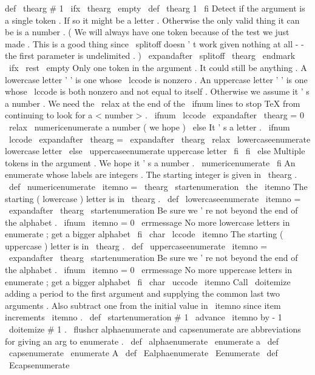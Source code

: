 {{def
\
thearg
{
#
1
}
%
\
ifx
\
thearg
\
empty
\
def
\
thearg
{
1
}
\
fi
%
%
Detect
if
the
argument
is
a
single
token
.
If
so
it
might
be
a
%
letter
.
Otherwise
the
only
valid
thing
it
can
be
is
a
number
.
%
(
We
will
always
have
one
token
because
of
the
test
we
just
made
.
%
This
is
a
good
thing
since
\
splitoff
doesn
'
t
work
given
nothing
at
%
all
-
-
the
first
parameter
is
undelimited
.
)
\
expandafter
\
splitoff
\
thearg
\
endmark
\
ifx
\
rest
\
empty
%
Only
one
token
in
the
argument
.
It
could
still
be
anything
.
%
A
lowercase
letter
'
'
is
one
whose
\
lccode
is
nonzero
.
%
An
uppercase
letter
'
'
is
one
whose
\
lccode
is
both
nonzero
and
%
not
equal
to
itself
.
%
Otherwise
we
assume
it
'
s
a
number
.
%
%
We
need
the
\
relax
at
the
end
of
the
\
ifnum
lines
to
stop
TeX
from
%
continuing
to
look
for
a
<
number
>
.
%
\
ifnum
\
lccode
\
expandafter
\
thearg
=
0
\
relax
\
numericenumerate
%
a
number
(
we
hope
)
\
else
%
It
'
s
a
letter
.
\
ifnum
\
lccode
\
expandafter
\
thearg
=
\
expandafter
\
thearg
\
relax
\
lowercaseenumerate
%
lowercase
letter
\
else
\
uppercaseenumerate
%
uppercase
letter
\
fi
\
fi
\
else
%
Multiple
tokens
in
the
argument
.
We
hope
it
'
s
a
number
.
\
numericenumerate
\
fi
}
%
An
enumerate
whose
labels
are
integers
.
The
starting
integer
is
%
given
in
\
thearg
.
%
\
def
\
numericenumerate
{
%
\
itemno
=
\
thearg
\
startenumeration
{
\
the
\
itemno
}
%
}
%
The
starting
(
lowercase
)
letter
is
in
\
thearg
.
\
def
\
lowercaseenumerate
{
%
\
itemno
=
\
expandafter
\
thearg
\
startenumeration
{
%
%
Be
sure
we
'
re
not
beyond
the
end
of
the
alphabet
.
\
ifnum
\
itemno
=
0
\
errmessage
{
No
more
lowercase
letters
in
enumerate
;
get
a
bigger
alphabet
}
%
\
fi
\
char
\
lccode
\
itemno
}
%
}
%
The
starting
(
uppercase
)
letter
is
in
\
thearg
.
\
def
\
uppercaseenumerate
{
%
\
itemno
=
\
expandafter
\
thearg
\
startenumeration
{
%
%
Be
sure
we
'
re
not
beyond
the
end
of
the
alphabet
.
\
ifnum
\
itemno
=
0
\
errmessage
{
No
more
uppercase
letters
in
enumerate
;
get
a
bigger
alphabet
}
\
fi
\
char
\
uccode
\
itemno
}
%
}
%
Call
\
doitemize
adding
a
period
to
the
first
argument
and
supplying
the
%
common
last
two
arguments
.
Also
subtract
one
from
the
initial
value
in
%
\
itemno
since
item
increments
\
itemno
.
%
\
def
\
startenumeration
#
1
{
%
\
advance
\
itemno
by
-
1
\
doitemize
{
#
1
.
}
\
flushcr
}
%
alphaenumerate
and
capsenumerate
are
abbreviations
for
giving
an
arg
%
to
enumerate
.
%
\
def
\
alphaenumerate
{
\
enumerate
{
a
}
}
\
def
\
capsenumerate
{
\
enumerate
{
A
}
}
\
def
\
Ealphaenumerate
{
\
Eenumerate
}
\
def
\
Ecapsenumerate
{
}}
